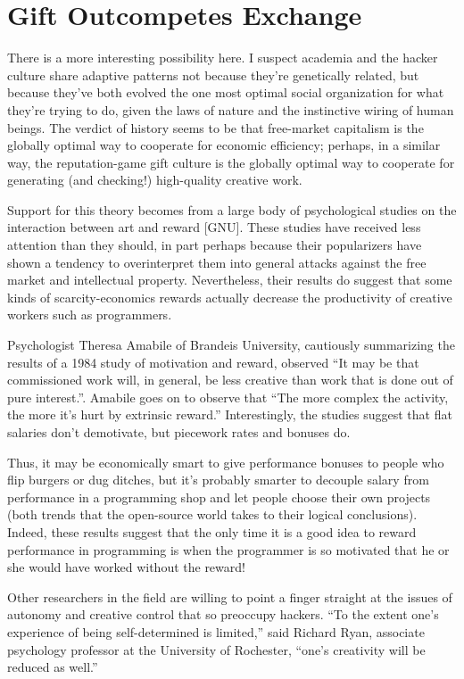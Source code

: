 \section{Gift Outcompetes Exchange}

There is a more interesting possibility here.  I suspect academia and the hacker
culture share adaptive patterns not because they're genetically related, but
because they've both evolved the one most optimal social organization for what
they're trying to do, given the laws of nature and the instinctive wiring of
human beings.  The verdict of history seems to be that free-market capitalism is
the globally optimal way to cooperate for economic efficiency; perhaps, in a
similar way, the reputation-game gift culture is the globally optimal way to
cooperate for generating (and checking!) high-quality creative work.

Support for this theory becomes from a large body of psychological studies on
the interaction between art and reward [GNU].  These studies have received less
attention than they should, in part perhaps because their popularizers have
shown a tendency to overinterpret them into general attacks against the free
market and intellectual property.  Nevertheless, their results do suggest that
some kinds of scarcity-economics rewards actually decrease the productivity of
creative workers such as programmers.

Psychologist Theresa Amabile of Brandeis University, cautiously summarizing the
results of a 1984 study of motivation and reward, observed ``It may be that
commissioned work will, in general, be less creative than work that is done out
of pure interest.''.  Amabile goes on to observe that ``The more complex the
activity, the more it's hurt by extrinsic reward.'' Interestingly, the studies
suggest that flat salaries don't demotivate, but piecework rates and bonuses do.

Thus, it may be economically smart to give performance bonuses to people who
flip burgers or dug ditches, but it's probably smarter to decouple salary from
performance in a programming shop and let people choose their own projects (both
trends that the open-source world takes to their logical conclusions).  Indeed,
these results suggest that the only time it is a good idea to reward performance
in programming is when the programmer is so motivated that he or she would have
worked without the reward!

Other researchers in the field are willing to point a finger straight at the
issues of autonomy and creative control that so preoccupy hackers.  ``To the
extent one's experience of being self-determined is limited,'' said Richard
Ryan, associate psychology professor at the University of Rochester, ``one's
creativity will be reduced as well.''


